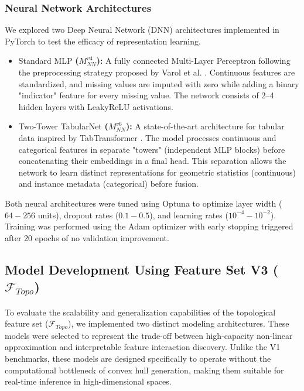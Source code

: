\documentclass{article}
\begin{document}
\subsubsection{Neural Network Architectures}
We explored two Deep Neural Network (DNN) architectures implemented in PyTorch to test the efficacy of representation learning.

\begin{itemize}
    \item Standard MLP\textbf{ ($M_{NN}^{v4}$):} A fully connected Multi-Layer Perceptron following the preprocessing strategy proposed by Varol et al. \cite{varol2024}. Continuous features are standardized, and missing values are imputed with zero while adding a binary "indicator" feature for every missing value. The network consists of 2–4 hidden layers with LeakyReLU activations.
    
    \item Two-Tower TabularNet\textbf{ ($M_{NN}^{v6}$):} A state-of-the-art architecture for tabular data inspired by TabTransformer \cite{huang2020tabtransformer}. The model processes continuous and categorical features in separate "towers" (independent MLP blocks) before concatenating their embeddings in a final head. This separation allows the network to learn distinct representations for geometric statistics (continuous) and instance metadata (categorical) before fusion.
\end{itemize}

Both neural architectures were tuned using Optuna to optimize layer width ($64-256$ units), dropout rates ($0.1-0.5$), and learning rates ($10^{-4}-10^{-2}$). Training was performed using the Adam optimizer with early stopping triggered after 20 epochs of no validation improvement.

\subsection{Model Development Using Feature Set V3 ($\mathcal{F}_{Topo}$)}
\label{subsec:v3_benchmarking}

To evaluate the scalability and generalization capabilities of the topological feature set ($\mathcal{F}_{Topo}$), we implemented two distinct modeling architectures. These models were selected to represent the trade-off between high-capacity non-linear approximation and interpretable feature interaction discovery. Unlike the V1 benchmarks, these models are designed specifically to operate without the computational bottleneck of convex hull generation, making them suitable for real-time inference in high-dimensional spaces.
\end{document}
